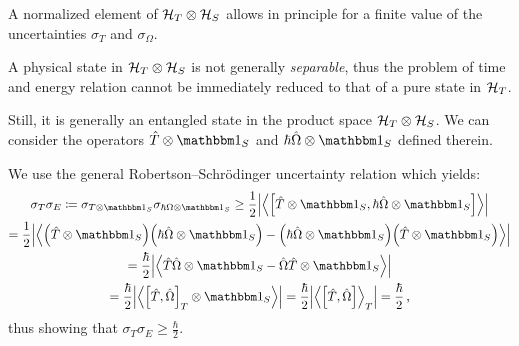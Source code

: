A normalized element of $\mathcal{H}_T \otimes \mathcal{H}_S$ allows in principle for a finite value
of the uncertainties $\sigma_{T}$ and $\sigma_{\Omega}$.

A physical state in $\mathcal{H}_T \otimes \mathcal{H}_S$ is not generally
\emph{separable},
thus
the problem of time and energy relation cannot be immediately reduced to that of
a pure state in $\mathcal{H}_T$.

Still, it is generally an entangled state in the product space $\mathcal{H}_T \otimes \mathcal{H}_S$.
We can consider the
operators $\op{T} \ox \idop_{S}$ and $\hbar\op{\Omega} \ox \idop_{S}$
defined therein.

We use the general Robertson--Schr\"{o}dinger uncertainty relation which yields:%
\begin{multline}
  \sigma_T \sigma_E \eqbydef
  \sigma_{T \ox \idop_S} \sigma_{\hbar\Omega \ox \idop_S} \geq
  \frac{1}{2} \abs{\expval{\comm
    {\op{T}\ox\idop_S} {\hbar\op{\Omega}\ox\idop_S}
  }}
  \\
  = \frac{1}{2} \abs{\expval{
      \qty(\op{T}\ox\idop_S) \qty(\hbar\op{\Omega}\ox\idop_S) -
      \qty(\hbar\op{\Omega}\ox\idop_S) \qty(\op{T}\ox\idop_S)
    }}
  \\
  = \frac{\hbar}{2} \abs{\expval{
    \op{T}\op{\Omega}\ox\idop_S - \op{\Omega}\op{T}\ox\idop_S
  }}
  \\ 
  = \frac{\hbar}{2} \abs{\expval{
    \comm{\op{T}}{\op{\Omega}}_T \ox \idop_S
  }} =
  \frac{\hbar}{2} \abs{\expval{\comm
    {\op{T}}{\op{\Omega}}
  }_T} =
  \frac{\hbar}{2}
  \,\text{,}
\end{multline}
thus showing that $\sigma_T \sigma_E \geq \frac{\hbar}{2}$. 





